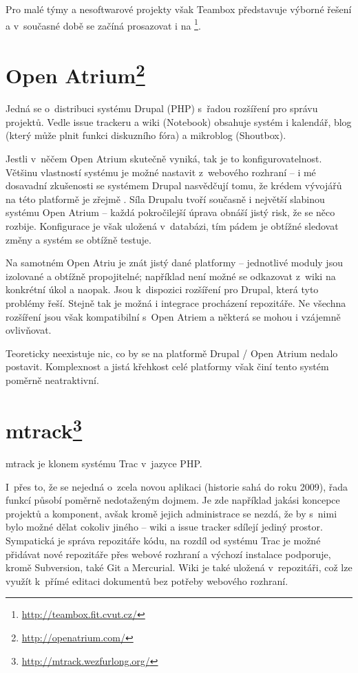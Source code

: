 \documentclass[thesis=B,czech]{FITthesis}[2012/05/02]
\begin{document}
Pro malé týmy a nesoftwarové projekty však Teambox představuje výborné řešení a
v~současné době se začíná prosazovat i na \footnote{\url{http://teambox.fit.cvut.cz/}}.

\section[Open Atrium]{Open Atrium\footnote{\url{http://openatrium.com/}}}

Jedná se o~distribuci systému Drupal (PHP) s~řadou rozšíření pro správu
projektů. Vedle issue trackeru a wiki (Notebook) obsahuje systém i
kalendář, blog (který může plnit funkci diskuzního fóra) a
\gls{mikroblog} (Shoutbox).

Jestli v~něčem Open Atrium skutečně vyniká, tak je to
konfigurovatelnost. Většinu vlastností systému je možné nastavit
z~webového rozhraní -- i mé dosavadní zkušenosti se systémem Drupal
nasvědčují tomu, že krédem vývojářů na této platformě je zřejmě
. Síla Drupalu tvoří současně i největší
slabinou systému Open Atrium -- každá pokročilejší úprava obnáší jistý
risk, že se něco rozbije. Konfigurace je však uložená v~databázi, tím
pádem je obtížné sledovat změny a systém se obtížně testuje.

Na samotném Open Atriu je znát jistý  dané platformy --
jednotlivé moduly jsou izolované a obtížně propojitelné; například není
možné se odkazovat z~wiki na konkrétní úkol a naopak. Jsou k~dispozici
rozšíření pro Drupal, která tyto problémy řeší. Stejně tak je možná i
integrace procházení repozitáře. Ne všechna rozšíření jsou však
kompatibilní s~Open Atriem a některá se mohou i vzájemně
ovlivňovat.

Teoreticky neexistuje nic, co by se na platformě Drupal / Open Atrium nedalo
postavit. Komplexnost a jistá křehkost celé platformy však činí tento
systém poměrně neatraktivní.

\section[mtrack]{mtrack\footnote{\url{http://mtrack.wezfurlong.org/}}}

mtrack je klonem systému Trac v~jazyce PHP.

I~přes to, že se nejedná o~zcela novou aplikaci (historie sahá do roku
2009), řada funkcí působí poměrně nedotaženým dojmem. Je zde například
jakási koncepce projektů a komponent, avšak kromě jejich administrace se
nezdá, že by s~nimi bylo možné dělat cokoliv jiného -- wiki a issue
tracker sdílejí jediný prostor. Sympatická je správa repozitáře kódu,
na rozdíl od systému Trac je možné přidávat nové repozitáře přes webové
rozhraní a výchozí instalace podporuje, kromě Subversion, také Git a
Mercurial. Wiki je také uložená v~repozitáři, což lze využít k~přímé
editaci dokumentů bez potřeby webového rozhraní.
\end{document}

